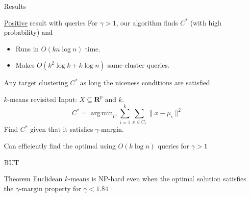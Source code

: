 \documentclass{beamer}
\newcommand{\mb}{\mathbf}
\DeclareMathOperator*{\argmin}{arg\,min}
\begin{document}
\begin{frame}[label=queryPositive]{Results}

	\begin{block}{\hyperlink{resultQueryPositive}{Positive} result with queries}
		\vspace{10pt}For $\gamma > 1$, our algorithm finds $C^*$ (with high probability) and 
		\begin{itemize}
		\vspace{10pt}\item Runs in $O(kn\log n)$ time.
        \vspace{10pt}\item Makes $O(k^2\log k + k\log n)$ same-cluster queries.
		\end{itemize}
	\end{block}
	
	\vspace{20pt}Any target clustering $C^*$ as long the niceness conditions are satisfied. 
\end{frame}

\begin{frame}{$k$-means revisited}
	Input: $X \subseteq \mb R^p$ and $k$.
	\vspace{-10pt}$$C^* = \argmin_{C} \sum_{i=1}^k \sum_{x \in C_i} \|x - \mu_i\|^2$$
	\vspace{10pt}Find $C^*$ given that it satisfies $\gamma$-margin.
	
	\vspace{20pt} {\color{blue}Can efficiently find the optimal using $O(k\log n)$ queries for $\gamma > 1$}
	\begin{center}
		\alert{BUT}
	\end{center}	
	\begin{block}{Theorem}
	Euclidean $k$-means is NP-hard even when the optimal solution satisfies the $\gamma$-margin property for $\gamma < 1.84$
	\end{block}
	
\end{frame}
\end{document}
